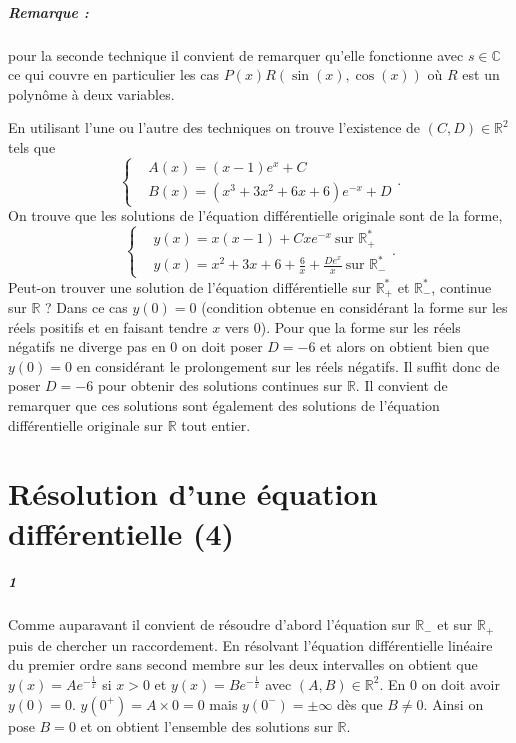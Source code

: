 \documentclass[10pt,a4paper]{article}
\begin{document}
\subparagraph{Remarque :} pour la seconde technique il convient de remarquer qu'elle fonctionne avec $s \in \mathbb{C}$ ce qui couvre en particulier les cas $P(x) R(\sin(x),\cos(x))$ où $R$ est un polynôme à deux variables.

En utilisant l'une ou l'autre des techniques on trouve l'existence de $(C,D) \in \mathbb{R}^2$ tels que 
\begin{equation*}
\left\lbrace
\begin{aligned}
&A(x) = (x-1)e^x + C\\
&B(x) = (x^3 +3x^2 + 6x +6)e^{-x} +D
\end{aligned}
\right. .
\end{equation*}
On trouve que les solutions de l'équation différentielle originale sont de la forme,
\begin{equation*}
\left\lbrace
\begin{aligned}
&y(x) = x(x-1) + Cxe^{-x} \ \text{sur } \mathbb{R}_+^* \\
&y(x) =  x^2+3x+6+\frac{6}{x} + \frac{De^x}{x}\ \text{sur } \mathbb{R}_-^*
\end{aligned}
\right. .
\end{equation*}
Peut-on trouver une solution de l'équation différentielle sur $\mathbb{R}_+^*$ et $\mathbb{R}_-^*$, continue sur $\mathbb{R}$ ? Dans ce cas $y(0) = 0$ (condition obtenue en considérant la forme sur les réels positifs et en faisant tendre $x$ vers $0$). Pour que la forme sur les réels négatifs ne diverge pas en $0$ on doit poser $D=-6$ et alors on obtient bien que $y(0)=0$ en considérant le prolongement sur les réels négatifs. Il suffit donc de poser $D=-6$ pour obtenir des solutions continues sur $\mathbb{R}$. Il convient de remarquer que ces solutions sont également des solutions de l'équation différentielle originale sur $\mathbb{R}$ tout entier.
\section{Résolution d'une équation différentielle (4)}
\subparagraph{1}Comme auparavant il convient de résoudre d'abord l'équation sur $\mathbb{R}_-$ et sur $\mathbb{R}_+$ puis de chercher un raccordement. En résolvant l'équation différentielle linéaire du premier ordre sans second membre sur les deux intervalles on obtient que $y(x) = Ae^{-\frac{1}{x}}$ si $x >0$ et $y(x) = Be^{-\frac{1}{x}}$ avec $(A,B) \in \mathbb{R}^2$. En $0$ on doit avoir $y(0) =0$. $y(0^+) = A \times 0 = 0$ mais $y(0^-) = \pm \infty$ dès que $B \neq 0$. Ainsi on pose $B= 0$ et on obtient l'ensemble des solutions sur $\mathbb{R}$.
\end{document}
